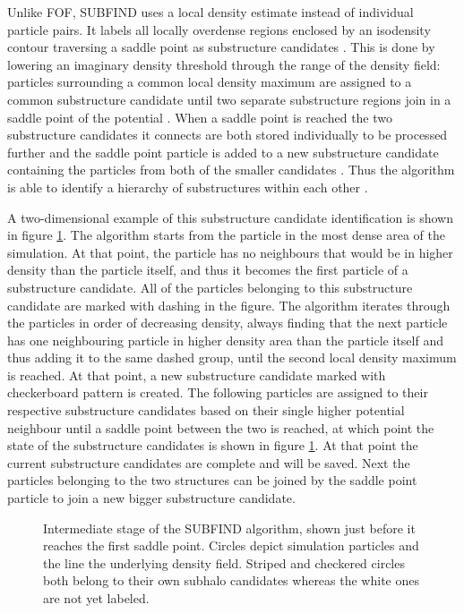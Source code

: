 \documentclass[english, oneside]{HYgradu}
\begin{document}
Unlike FOF, SUBFIND uses a local density estimate instead of individual particle pairs. It labels all locally overdense regions enclosed by an isodensity contour traversing a saddle point as substructure candidates \citep{springel2001populating}. This is done by lowering an imaginary density threshold through the range of the density field: particles surrounding a common local density maximum are assigned to a common substructure candidate until two separate substructure regions join in a saddle point of the potential \citep{springel2001populating}. When a saddle point is reached the two substructure candidates it connects are both stored individually to be processed further and the saddle point particle is added to a new substructure candidate containing the particles from both of the smaller candidates \citep{springel2001populating}. Thus the algorithm is able to identify a hierarchy of substructures within each other \citep{springel2001populating}.

A two-dimensional example of this substructure candidate identification is shown in figure \ref{fig:subfind}. The algorithm starts from the particle in the most dense area of the simulation. At that point, the particle has no neighbours that would be in higher density than the particle itself, and thus it becomes the first particle of a substructure candidate. All of the particles belonging to this substructure candidate are marked with dashing in the figure. The algorithm iterates through the particles in order of decreasing density, always finding that the next particle has one neighbouring particle in higher density area than the particle itself and thus adding it to the same dashed group, until the second local density maximum is reached. At that point, a new substructure candidate marked with checkerboard pattern is created. The following particles are assigned to their respective substructure candidates based on their single higher potential neighbour until a saddle point between the two is reached, at which point the state of the substructure candidates is shown in figure \ref{fig:subfind}. At that point the current substructure candidates are complete and will be saved. Next the particles belonging to the two structures can be joined by the saddle point particle to join a new bigger substructure candidate.

\begin{figure}
    \centering
    
    \caption{Intermediate stage of the SUBFIND algorithm, shown just before it reaches the first saddle point. Circles depict simulation particles and the line the underlying density field. Striped and checkered circles both belong to their own subhalo candidates whereas the white ones are not yet labeled.}\label{fig:subfind}
\end{figure}
\end{document}
